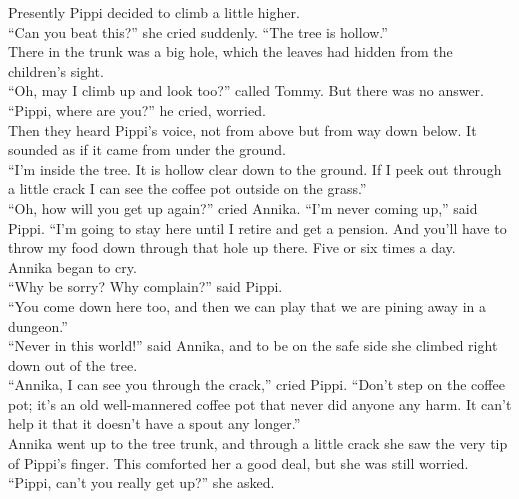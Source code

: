 \documentclass{standard}
\begin{document}
Presently Pippi decided to climb a little higher.\\

“Can you beat this?” she cried suddenly. “The tree is hollow.”\\

There in the trunk was a big hole, which the leaves had hidden from the children’s sight.\\

“Oh, may I climb up and look too?” called Tommy. But there was no answer. “Pippi, where are you?” he cried, worried.\\

Then they heard Pippi’s voice, not from above but from way down below. It sounded as if it came from under the ground.\\

“I’m inside the tree. It is hollow clear down to the ground. If I peek out through a little crack I can see the coffee pot outside on the grass.”\\

“Oh, how will you get up again?” cried Annika. “I’m never coming up,” said Pippi. “I’m going to stay here until I retire and get a pension. And you’ll have to throw my food down through that hole up there. Five or six times a day.\\

Annika began to cry.\\

“Why be sorry? Why complain?” said Pippi.\\

“You come down here too, and then we can play that we are pining away in a dungeon.”\\

“Never in this world!” said Annika, and to be on the safe side she climbed right down out of the tree.\\

“Annika, I can see you through the crack,” cried Pippi. “Don’t step on the coffee pot; it’s an old well-mannered coffee pot that never did anyone any harm. It can’t help it that it doesn’t have a spout any longer.”\\

Annika went up to the tree trunk, and through a little crack she saw the very tip of Pippi’s finger. This comforted her a good deal, but she was still worried.\\

“Pippi, can’t you really get up?” she asked.\\
\end{document}
